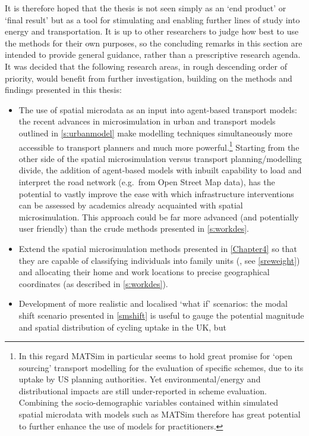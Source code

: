 \documentclass[a4paper, 11pt, twoside]{Thesis}
\begin{document}
It is therefore hoped that the thesis is not seen simply as an `end product' or `final
result' but as a tool for stimulating and enabling further lines of study into
energy and transportation. It is up to other researchers to
judge how best to use the methods for their own purposes, so the concluding
remarks in this section are intended to provide general guidance, rather than a
prescriptive research agenda. It was decided that the following research areas,
in rough descending order of priority, would benefit from further investigation,
building on the methods and findings presented in this thesis:
\begin{itemize}
 \item The use of spatial microdata as an input into agent-based
transport models: the recent advances in microsimulation in urban and transport
models outlined in \cref{s:urbanmodel} make modelling techniques simultaneously
more accessible to transport planners and much more
powerful.\footnote{In this
regard MATSim in particular
seems to hold great promise for `open sourcing' transport modelling for the
evaluation of specific schemes, due to its uptake by US planning authorities.
Yet environmental/energy and distributional impacts are still under-reported in
scheme evaluation. Combining the socio-demographic variables contained within
simulated spatial microdata with models such as MATSim therefore has great
potential to further enhance the use of models for practitioners.
}
Starting from
the other side of the spatial microsimulation versus transport
planning/modelling
divide, the addition of agent-based models with inbuilt capability to load and
interpret the road network (e.g.~from Open Street Map data), has the potential
to vastly improve the ease with which infrastructure interventions can be
assessed by academics already acquainted with spatial microsimulation. This
approach could be far more advanced (and potentially user
friendly) than the crude methods presented in \cref{s:workdes}.
\item Extend the spatial microsimulation methods presented in \cref{Chapter4} so
that they are capable of classifying individuals into family units
(\citealp{Pritchard2012}, see \cref{sreweight}) and allocating their home and
work locations to precise geographical coordinates (as described in
\cref{s:workdes}).
\item Development of more realistic and localised `what if' scenarios: 
the modal shift scenario presented in \cref{smshift} is useful to gauge the
potential magnitude and spatial distribution of cycling uptake in the UK, but

\end{itemize}
\end{document}
